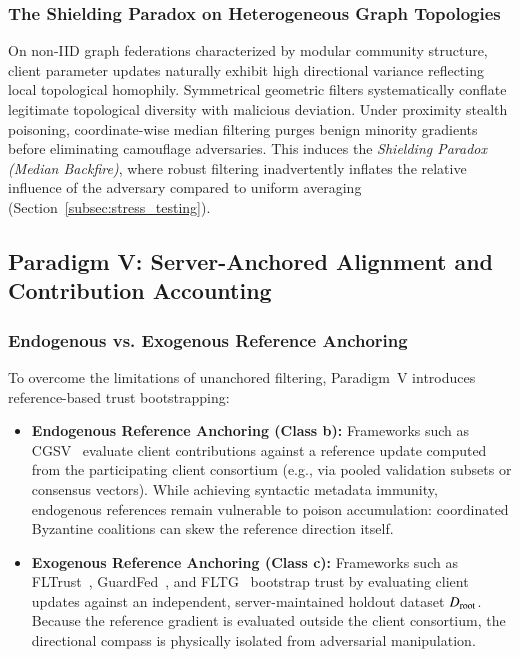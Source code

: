 \subsubsection{The Shielding Paradox on Heterogeneous Graph Topologies}
On non-IID graph federations characterized by modular community structure, client parameter updates naturally exhibit high directional variance reflecting local topological homophily. Symmetrical geometric filters systematically conflate legitimate topological diversity with malicious deviation. Under proximity stealth poisoning, coordinate-wise median filtering purges benign minority gradients before eliminating camouflage adversaries. This induces the \emph{Shielding Paradox (Median Backfire)}, where robust filtering inadvertently inflates the relative influence of the adversary compared to uniform averaging (Section~\ref{subsec:stress_testing}).

\subsection{Paradigm V: Server-Anchored Alignment and Contribution Accounting}
\label{subsec:rw_paradigm_5}

\subsubsection{Endogenous vs. Exogenous Reference Anchoring}
To overcome the limitations of unanchored filtering, Paradigm~V introduces reference-based trust bootstrapping:
\begin{itemize}[leftmargin=*]
    \item \textbf{Endogenous Reference Anchoring (Class b):} Frameworks such as CGSV~\citep{xu2021gradient} evaluate client contributions against a reference update computed from the participating client consortium (e.g., via pooled validation subsets or consensus vectors). While achieving syntactic metadata immunity, endogenous references remain vulnerable to poison accumulation: coordinated Byzantine coalitions can skew the reference direction itself.
    \item \textbf{Exogenous Reference Anchoring (Class c):} Frameworks such as FLTrust~\citep{cao2021fltrust}, GuardFed~\citep{li2025guardfed}, and FLTG~\citep{wen2025fltg} bootstrap trust by evaluating client updates against an independent, server-maintained holdout dataset $D_{\mathrm{root}}$. Because the reference gradient is evaluated outside the client consortium, the directional compass is physically isolated from adversarial manipulation.
\end{itemize}

